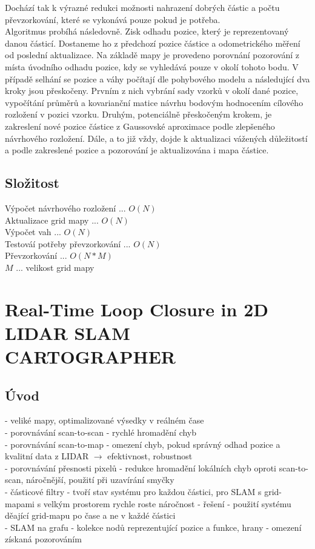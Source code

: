 \documentclass[11pt]{article}
\begin{document}
Dochází tak k výrazné redukci možnosti nahrazení dobrých částic a počtu převzorkování, které se vykonává pouze pokud je potřeba.\\
\indent Algoritmus probíhá následovně. Zisk odhadu pozice, který je reprezentovaný danou částicí. Dostaneme ho z předchozí pozice částice a odometrického měření od poslední aktualizace. Na základě mapy je provedeno porovnání pozorování z místa úvodního odhadu pozice, kdy se vyhledává pouze v okolí tohoto bodu. V případě selhání se pozice a váhy počítají dle pohybového modelu a následující dva kroky jsou přeskočeny. Prvním z nich vybrání sady vzorků v okolí dané pozice, vypočítání průměrů a kovarianční matice návrhu bodovým hodnocením cílového rozložení v pozici vzorku. Druhým, potenciálně přeskočeným krokem, je zakreslení nové pozice částice z Gaussovské aproximace podle zlepšeného návrhového rozložení. Dále, a to již vždy, dojde k aktualizaci vážených důležitostí a podle zakreslené pozice a pozorování je aktualizována i mapa částice. 
 
\subsection{Složitost}
Výpočet návrhového rozložení ... $O(N)$\\
Aktualizace grid mapy ... $O(N)$\\
Výpočet vah ... $O(N)$\\
Testováí potřeby převzorkování ... $O(N)$\\
Převzorkování ... $O(N*M)$\\
$M$ ... velikost grid mapy\\



\newpage

\section{Real-Time Loop Closure in 2D LIDAR SLAM \\ CARTOGRAPHER}

\subsection{Úvod}
- veliké mapy, optimalizované výsedky v reálném čase\\
- porovnávání scan-to-scan - rychlé hromadění chyb\\
- porovnávání scan-to-map -  omezení chyb, pokud správný odhad pozice a kvalitní data z LIDAR $\rightarrow$ efektivnost, robustnost\\
- porovnávání přesnosti pixelů - redukce hromadění lokálních chyb oproti scan-to-scan, náročnější, použití při uzavírání smyčky\\
- částicové filtry - tvoří stav systému pro každou částici, pro SLAM s grid-mapami s velkým prostorem rychle roste náročnost - řešení - použití systému děající grid-mapu po čase a ne v každé částici\\
- SLAM na grafu - kolekce nodů reprezentující pozice a funkce, hrany - omezení získaná pozorováním\\
\end{document}
